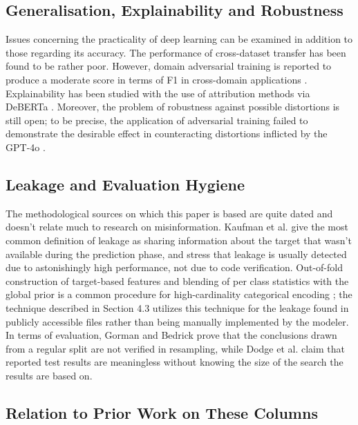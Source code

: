 \subsection{Generalisation, Explainability and Robustness}

Issues concerning the practicality of deep learning can be examined in addition to those regarding its accuracy. The performance of cross-dataset transfer has been found to be rather poor. However, domain adversarial training is reported to produce a moderate score in terms of F1 in cross-domain applications \cite{patel2025cross}. Explainability has been studied with the use of attribution methods via DeBERTa \cite{nguyen2025explaining}. Moreover, the problem of robustness against possible distortions is still open; to be precise, the application of adversarial training failed to demonstrate the desirable effect in counteracting distortions inflicted by the GPT-4o \cite{almansoori2025adversarial}.

\subsection{Leakage and Evaluation Hygiene}

The methodological sources on which this paper is based are quite dated and doesn't relate much to research on misinformation. Kaufman et al. \cite{kaufman2012leakage} give the most common definition of leakage as sharing information about the target that wasn't available during the prediction phase, and stress that leakage is usually detected due to astonishingly high performance, not due to code verification. Out-of-fold construction of target-based features and blending of per class statistics with the global prior is a common procedure for high-cardinality categorical encoding \cite{miccibarreca2001preprocessing}; the technique described in Section 4.3 utilizes this technique for the leakage found in publicly accessible files rather than being manually implemented by the modeler. In terms of evaluation, Gorman and Bedrick \cite{gorman2019standard} prove that the conclusions drawn from a regular split are not verified in resampling, while Dodge et al. \cite{dodge2019show} claim that reported test results are meaningless without knowing the size of the search the results are based on.

\subsection{Relation to Prior Work on These Columns}

